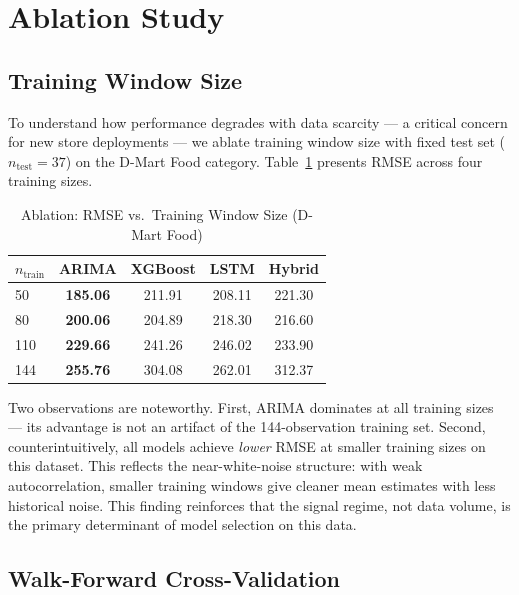 \documentclass[journal]{IEEEtran}
\begin{document}
\section{Ablation Study}
\label{sec:ablation}

\subsection{Training Window Size}

To understand how performance degrades with data scarcity — a critical concern for new store deployments — we ablate training window size with fixed test set ($n_{\text{test}}{=}37$) on the D-Mart Food category. Table~\ref{tab:ablation} presents RMSE across four training sizes.

\begin{table}[htbp]
\centering
\caption{Ablation: RMSE vs.\ Training Window Size (D-Mart Food)}
\label{tab:ablation}
\begin{tabular}{lcccc}
\toprule
$n_{\text{train}}$ & \textbf{ARIMA} & \textbf{XGBoost} & \textbf{LSTM} & \textbf{Hybrid} \\
\midrule
50  & \textbf{185.06} & 211.91 & 208.11 & 221.30 \\
80  & \textbf{200.06} & 204.89 & 218.30 & 216.60 \\
110 & \textbf{229.66} & 241.26 & 246.02 & 233.90 \\
144 & \textbf{255.76} & 304.08 & 262.01 & 312.37 \\
\bottomrule
\end{tabular}
\end{table}

Two observations are noteworthy. First, ARIMA dominates at all training sizes — its advantage is not an artifact of the 144-observation training set. Second, counterintuitively, all models achieve \emph{lower} RMSE at smaller training sizes on this dataset. This reflects the near-white-noise structure: with weak autocorrelation, smaller training windows give cleaner mean estimates with less historical noise. This finding reinforces that the signal regime, not data volume, is the primary determinant of model selection on this data.

\subsection{Walk-Forward Cross-Validation}
\label{sec:wfcv}
\end{document}
